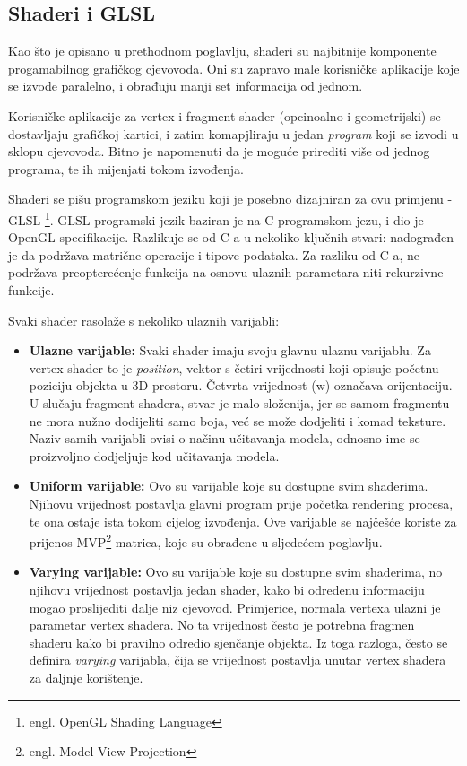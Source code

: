 \subsection{Shaderi i GLSL}

Kao što je opisano u prethodnom poglavlju, shaderi su najbitnije komponente progamabilnog grafičkog cjevovoda. Oni su zapravo male korisničke aplikacije koje se izvode paralelno, i obrađuju manji set informacija od jednom.

Korisničke aplikacije za vertex i fragment shader (opcinoalno i geometrijski) se dostavljaju grafičkoj kartici, i zatim komapjliraju u jedan \emph{program} koji se izvodi u sklopu cjevovoda. Bitno je napomenuti da je moguće prirediti više od jednog programa, te ih mijenjati tokom izvođenja.

Shaderi se pišu programskom jeziku koji je posebno dizajniran za ovu primjenu - GLSL \footnote{engl. OpenGL Shading Language}. GLSL programski jezik baziran je na C programskom jezu, i dio je OpenGL specifikacije. Razlikuje se od C-a u nekoliko ključnih stvari: nadograđen je da podržava matrične operacije i tipove podataka. Za razliku od C-a, ne podržava preopterećenje funkcija na osnovu ulaznih parametara niti rekurzivne funkcije.

Svaki shader rasolaže s nekoliko ulaznih varijabli:

\begin{itemize}

\item \textbf{Ulazne varijable:} Svaki shader imaju svoju glavnu ulaznu varijablu. Za vertex shader to je \emph{position}, vektor s četiri vrijednosti koji opisuje početnu poziciju objekta u 3D prostoru. Četvrta vrijednost (w) označava orijentaciju. U slučaju fragment shadera, stvar je malo složenija, jer se samom fragmentu ne mora nužno dodijeliti samo boja, već se može dodjeliti i komad teksture. Naziv samih varijabli ovisi o načinu učitavanja modela, odnosno ime se proizvoljno dodjeljuje kod učitavanja modela.

\item \textbf{Uniform varijable:} Ovo su varijable koje su dostupne svim shaderima. Njihovu vrijednost postavlja glavni program prije početka rendering procesa, te ona ostaje ista tokom cijelog izvođenja. Ove varijable se najčešće koriste za prijenos MVP\footnote{engl. Model View Projection} matrica, koje su obrađene u sljedećem poglavlju.

\item \textbf{Varying varijable:} Ovo su varijable koje su dostupne svim shaderima, no njihovu vrijednost postavlja jedan shader, kako bi određenu informaciju mogao proslijediti dalje niz cjevovod. Primjerice, normala vertexa ulazni je parametar vertex shadera. No ta vrijednost često je potrebna fragmen shaderu kako bi pravilno odredio sjenčanje objekta. Iz toga razloga, često se definira \emph{varying} varijabla, čija se vrijednost postavlja unutar vertex shadera za daljnje korištenje.
\end{itemize}

